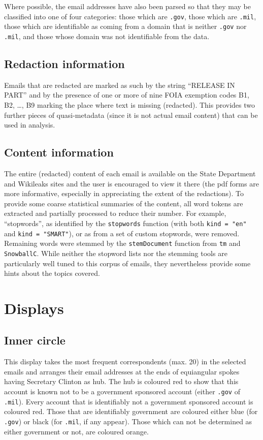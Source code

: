 \documentclass[journal]{vgtc}                %
\begin{document}
Where possible, the email addresses have also been parsed so that they may be classified into one of four categories: those which are \texttt{.gov},  those which are \texttt{.mil},  those which are identifiable as coming from a domain that is neither  \texttt{.gov} nor  \texttt{.mil}, and those whose domain was not identifiable from the data.
\subsection{Redaction information}
\label{sect:data:redact}
Emails that are redacted are marked as such by the string ``RELEASE IN PART'' and by the presence of one or more of nine FOIA exemption codes B1, B2, \ldots, B9  marking the place where text is missing (redacted).  This provides two further pieces of quasi-metadata (since it is not actual email content) that can be used in analysis.
\subsection{Content information}
\label{sect:data:contentinfo}
The entire (redacted) content of each email is available on the State Department and Wikileaks sites and the user is encouraged to view it there (the pdf forms are more informative, especially in appreciating the extent of the redactions).  To provide some coarse statistical summaries of the content, all word tokens are extracted and partially processed to reduce their number.  For example,  ``stopwords'', as identified by the \texttt{stopwords} function (with both  \texttt{kind = "en"} and  \texttt{kind = "SMART"}), or as from a set of custom stopwords, were removed.  Remaining words were stemmed by the \texttt{stemDocument} function from \texttt{tm} and \texttt{SnowballC}.   While neither the stopword lists nor the stemming tools are particularly well tuned to this corpus of emails, they nevertheless provide some hints about the topics covered.  

\section{Displays}
\label{sect:Displays}
\subsection{Inner circle}
\label{sect:Displays:circle} 
This display takes the most frequent correspondents (max. 20) in the selected emails and arranges their email addresses  at the ends of  equiangular spokes having Secretary Clinton as hub.  The hub is coloured red to show that this account is known not to be a government sponsored account (either \texttt{.gov} of \texttt{.mil}).  Every account that is identifiably not a government sponsored account is coloured red.  Those that are identifiably government are coloured either blue (for \texttt{.gov}) or black (for \texttt{.mil}, if any appear).  Those which can not be determined as either government or not, are coloured orange.
\end{document}
